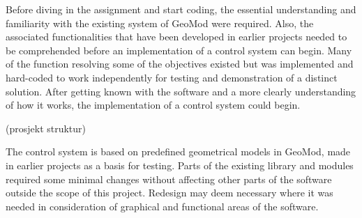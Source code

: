 Before diving in the assignment and start coding, the essential understanding and familiarity with the existing system of GeoMod were required.  Also, the associated functionalities that have been developed in earlier projects needed to be comprehended before an implementation of a control system can begin. Many of the function resolving some of the objectives existed but was implemented and hard-coded to work independently for testing and demonstration of a distinct solution. After getting known with the software and a more clearly understanding of how it works, the implementation of a control system could begin. 


(prosjekt struktur)


The control system is based on predefined geometrical models in GeoMod, made in earlier projects as a basis for testing. Parts of the existing library and modules required some minimal changes without affecting other parts of the software outside the scope of this project.
Redesign may deem necessary where it was needed in consideration of graphical and functional areas of the software.


